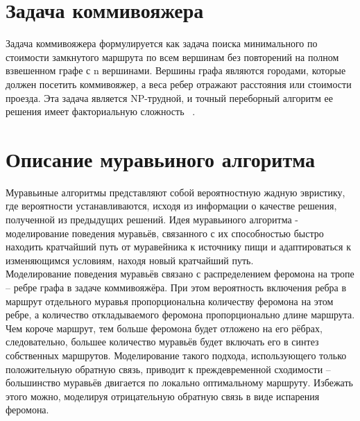 \documentclass[12pt, a4paper]{report}
\begin{document}
	\section{Задача коммивояжера}
	
	Задача коммивояжера формулируется как задача поиска минимального по стоимости замкнутого маршрута по всем вершинам без повторений
	на полном взвешенном графе с n вершинами. Вершины графа являются
	городами, которые должен посетить коммивояжер, а веса ребер отражают
	расстояния или стоимости проезда. Эта задача является NP-трудной, и точный переборный алгоритм ее решения имеет факториальную сложность ~\cite{kom}.

	\section{Описание муравьиного алгоритма}
	
	Муравьиные алгоритмы представляют собой вероятностную жадную эвристику, где вероятности устанавливаются, исходя из информации о качестве решения, полученной из предыдущих решений. Идея муравьиного алгоритма - моделирование поведения муравьёв, связанного с их способностью быстро находить кратчайший путь от муравейника к источнику пищи
	и адаптироваться к изменяющимся условиям, находя новый кратчайший
	путь.\\
	
	Моделирование поведения муравьёв связано с распределением феромона на тропе – ребре графа в задаче коммивояжёра. При этом вероятность включения ребра в маршрут отдельного муравья пропорциональна количеству феромона на этом ребре, а количество откладываемого феромона
	пропорционально длине маршрута. Чем короче маршрут, тем больше феромона будет отложено на его рёбрах, следовательно, большее количество муравьёв будет включать его в синтез собственных маршрутов. Моделирование такого подхода, использующего только положительную обратную
	связь, приводит к преждевременной сходимости – большинство муравьёв двигается по локально оптимальному маршруту. Избежать этого можно, моделируя отрицательную обратную связь в виде испарения феромона.\\
	
\end{document}
